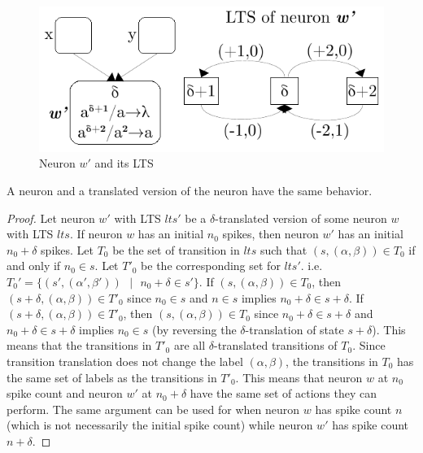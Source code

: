 \documentclass[runningheads,a4paper]{llncs}
\theoremstyle{definition}
\newcommand{\se}{\text{ }}
\begin{document}

\begin{figure}[h]
   \centering
   \includegraphics[scale=0.70]{fig-lts-3.pdf}
   \caption{Neuron $w'$ and its LTS}
   \label{fig-lts-3}
\end{figure}

\begin{lemma}
A neuron and a translated version of the neuron have the same behavior.
\end{lemma}

\begin{proof}
Let neuron $w'$ with LTS $lts'$ be a $\delta$-translated version of some neuron $w$ with LTS $lts$. 
If neuron $w$ has an initial $n_0$ spikes, then neuron $w'$ has an initial $n_0+\delta$ spikes. Let 
$T_0$ be the set of transition in $lts$ such that $(s,(\alpha,\beta))\in T_0$ if and only if 
$n_0\in s$. Let $T'_0$ be the corresponding set for $lts'$. i.e. $T_0'=\{(s',(\alpha',\beta'))\se|\se
n_0+\delta \in s'\}$. If $(s,(\alpha,\beta))\in T_0$, then $(s+\delta,(\alpha,\beta)) \in T'_0$ since
$n_0\in s$ and $n\in s$ implies $n_0+\delta \in s+\delta$. If  $(s+\delta,(\alpha,\beta)) \in T'_0$,
then $(s,(\alpha,\beta))\in T_0$ since $n_0+\delta \in s+\delta$ and $n_0+\delta \in s+\delta$ implies
$n_0\in s$ (by reversing the $\delta$-translation of state $s+\delta$). This means that the 
transitions in $T'_0$ are all $\delta$-translated transitions of $T_0$. Since transition translation
does not change the label $(\alpha,\beta)$, the transitions in $T_0$ has the same set of labels as
the transitions in $T'_0$. This means that neuron $w$ at $n_0$ spike count and neuron $w'$ at $n_0+
\delta$ have the same set of actions they can perform. The same argument can be used for when neuron
$w$ has spike count $n$ (which is not necessarily the initial spike count) while neuron $w'$ has
spike count $n+\delta$.
\end{proof}
\end{document}
